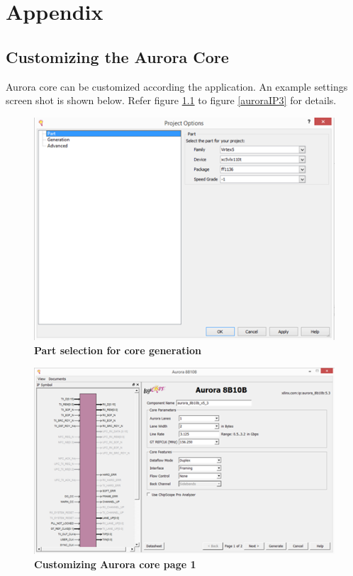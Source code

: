 \begin{appendix}
\label{appe}
\chapter{Appendix}
\section {Customizing the Aurora Core}
\label{coregen}
Aurora core can be customized according the application. An example settings screen shot is shown below.  Refer figure \ref{auroraIP1} to figure \ref{auroraIP3} for details.
\begin{figure}[H]
  \centering
   \includegraphics[scale=1]{./figs/auroraIP1}
  \caption{\textbf{Part selection for core generation}}
  \label{auroraIP1}
\end{figure}

\begin{figure}[H]
  \centering
   \includegraphics[scale=1]{./figs/auroraIP2}
  \caption{\textbf{Customizing Aurora core page 1}}
  \label{auroraIP2}
\end{figure}


\end{appendix}
